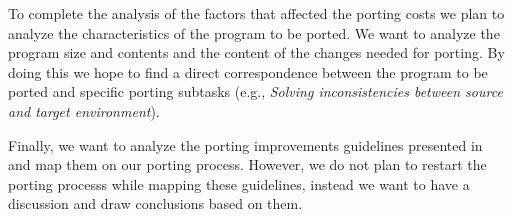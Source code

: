 To complete the analysis of the factors that affected the porting costs we plan
to analyze the characteristics of the program to be ported. We want to analyze
the program size and contents and the content of the changes needed for porting.
By doing this we hope to find a direct correspondence between the program to be
ported and specific porting subtasks (e.g., \textit{Solving inconsistencies
between source and target environment}).

Finally, we want to analyze the porting improvements guidelines presented
in~\cite{b1} and map them on our porting process. However, we do not plan to
restart the porting processs while mapping these guidelines, instead we want to
have a discussion and draw conclusions based on them.
